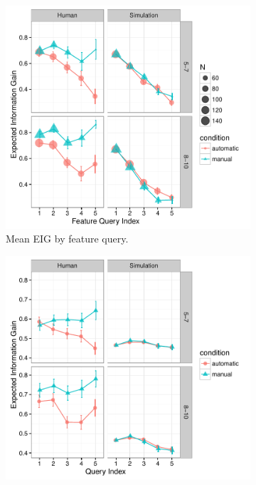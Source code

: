 \documentclass[man,floatsintext]{apa6}
\begin{document}
 \begin{figure}[t] %
  \begin{subfigure}{.57\textwidth}
  \centering
  \includegraphics[width=.97\linewidth]{figures/info_gain_by_click_n_age_w_sims}
  \caption{Mean EIG by feature query.}
  \label{fig:sfig1}
\end{subfigure}%
\begin{subfigure}{.43\textwidth}
  \centering
  \includegraphics[width=.99\linewidth]{figures/all_info_gain_by_click_n_age_w_sims}

\end{subfigure}
\end{figure}
\end{document}
